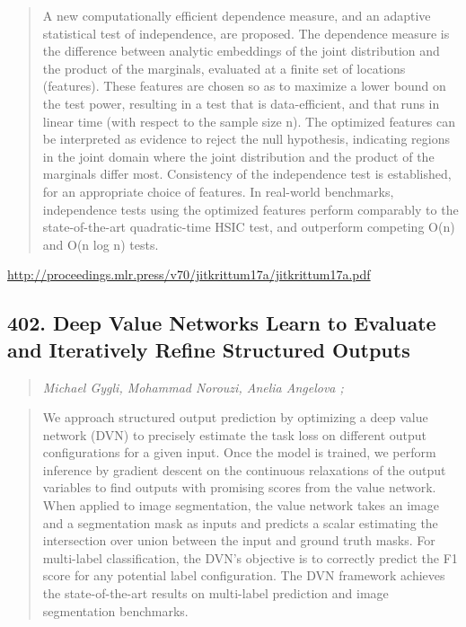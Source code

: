 \documentclass{article}
\begin{document}
\begin{quote}
    A new computationally efficient dependence measure, and an adaptive statistical test of independence, are proposed. The dependence measure is the difference between analytic embeddings of the joint distribution and the product of the marginals, evaluated at a finite set of locations (features). These features are chosen so as to maximize a lower bound on the test power, resulting in a test that is data-efficient, and that runs in linear time (with respect to the sample size n). The optimized features can be interpreted as evidence to reject the null hypothesis, indicating regions in the joint domain where the joint distribution and the product of the marginals differ most. Consistency of the independence test is established, for an appropriate choice of features. In real-world benchmarks, independence tests using the optimized features perform comparably to the state-of-the-art quadratic-time HSIC test, and outperform competing O(n) and O(n log n) tests.  \end{quote}

\href{http://proceedings.mlr.press/v70/jitkrittum17a/jitkrittum17a.pdf}{http://proceedings.mlr.press/v70/jitkrittum17a/jitkrittum17a.pdf}

\subsection{402. Deep Value Networks Learn to Evaluate and Iteratively Refine Structured Outputs}

\begin{quote}
\footnotesize{\textit{Michael Gygli, Mohammad Norouzi, Anelia Angelova ;}}
\end{quote}

\begin{quote}
    We approach structured output prediction by optimizing a deep value network (DVN) to precisely estimate the task loss on different output configurations for a given input. Once the model is trained, we perform inference by gradient descent on the continuous relaxations of the output variables to find outputs with promising scores from the value network. When applied to image segmentation, the value network takes an image and a segmentation mask as inputs and predicts a scalar estimating the intersection over union between the input and ground truth masks. For multi-label classification, the DVN’s objective is to correctly predict the F1 score for any potential label configuration. The DVN framework achieves the state-of-the-art results on multi-label prediction and image segmentation benchmarks.  \end{quote}
\end{document}
